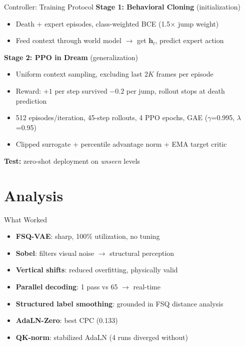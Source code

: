 \documentclass[aspectratio=169]{beamer}
\begin{document}
\begin{frame}{Controller: Training Protocol}
  \vspace{0.5em}
  \textbf{Stage 1: Behavioral Cloning} (initialization)
  \begin{itemize}
    \item Death + expert episodes, class-weighted BCE (1.5$\times$ jump weight)
    \item Feed context through world model $\to$ get $\mathbf{h}_t$, predict expert action
  \end{itemize}

  \vspace{0.5em}
  \textbf{Stage 2: PPO in Dream} (generalization)
  \begin{itemize}
    \item Uniform context sampling, excluding last $2K$ frames per episode
    \item Reward: $+1$ per step survived $-0.2$ per jump, rollout stops at death prediction
    \item 512 episodes/iteration, 45-step rollouts, 4 PPO epochs, GAE ($\gamma$=0.995, $\lambda$=0.95)
    \item Clipped surrogate + percentile advantage norm + EMA target critic
  \end{itemize}

  \vspace{0.5em}
  \textbf{Test:} zero-shot deployment on \emph{unseen} levels
\end{frame}

\section{Analysis}

\begin{frame}{What Worked}
  \vspace{0.5em}
  \begin{itemize}
    \item \textbf{FSQ-VAE}: sharp, 100\% utilization, no tuning
    \item \textbf{Sobel}: filters visual noise $\to$ structural perception
    \item \textbf{Vertical shifts}: reduced overfitting, physically valid
    \item \textbf{Parallel decoding}: 1 pass vs 65 $\to$ real-time
    \item \textbf{Structured label smoothing}: grounded in FSQ distance analysis
    \item \textbf{AdaLN-Zero}: best CPC (0.133)
    \item \textbf{QK-norm}: stabilized AdaLN (4 runs diverged without)
  \end{itemize}
\end{frame}
\end{document}
